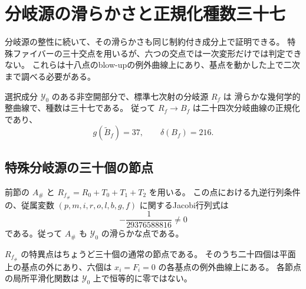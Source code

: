 \section{分岐源の滑らかさと正規化種数三十七}
\label{sec:septic-ramification-smoothness-v30}

分岐源の整性に続いて、その滑らかさも同じ制約付き成分上で証明できる。
特殊ファイバーの三十交点を用いるが、六つの交点では一次変形だけでは判定できない。
これらは十八点のblow-upの例外曲線上にあり、基点を動かした上で二次まで調べる必要がある。

\begin{theorem}[分岐曲線の正規化]
\label{thm:septic-ramification-smoothness-v30}
選択成分 $\mathcal Y_0$ のある非空開部分で、標準七次射の分岐源 $R_f$ は
滑らかな幾何学的整曲線で、種数は三十七である。
従って $R_f\to B_f$ は二十四次分岐曲線の正規化であり、
\[
 g(\widetilde B_f)=37,\qquad \delta(B_f)=216.
\]
\end{theorem}

\subsection{特殊分岐源の三十個の節点}

前節の $A_\#$ と $R_{f_\#}=R_0+T_0+T_1+T_2$ を用いる。
この点における九逆行列条件の、従属変数
$(p,m,i,r,o,l,b,g,f)$ に関するJacobi行列式は
\[
 -\frac{1}{29376588816}\ne0
\]
である。従って $A_\#$ も $\mathcal Y_0$ の滑らかな点である。

\begin{lemma}[節点とその局所平滑化]
\label{lem:septic-thirty-node-smoothing-v30}
$R_{f_\#}$ の特異点はちょうど三十個の通常の節点である。
そのうち二十四個は平面上の基点の外にあり、六個は
$x_i=F_i=0$ の各基点の例外曲線上にある。
各節点の局所平滑化関数は $\mathcal Y_0$ 上で恒等的に零ではない。
\end{lemma}

